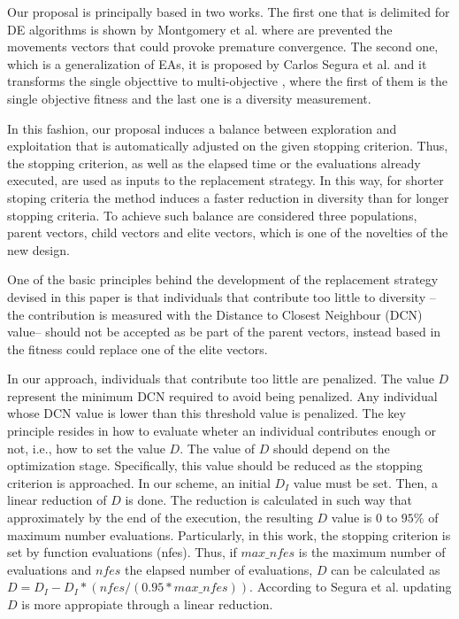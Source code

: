 Our proposal is principally based in two works.
%
The first one that is delimited for DE algorithms is shown by Montgomery et al. \cite{montgomery2012simple} where are prevented the movements vectors that could provoke premature convergence.
%
The second one, which is a generalization of EAs, it is proposed by Carlos Segura et al. and it transforms the single objecttive to multi-objective \cite{segura2016novel}, where the first of them is the single objective fitness and the last one is a diversity measurement.
%

In this fashion, our proposal induces a balance between exploration and exploitation that is automatically adjusted on the given stopping criterion.
%
Thus, the stopping criterion, as well as the elapsed time or the evaluations already executed, are used as inputs to the replacement strategy.
%
In this way, for shorter stoping criteria the method induces a faster reduction in diversity than for longer stopping criteria.
%
To achieve such balance are considered three populations, parent vectors, child vectors and elite vectors, which is one of the novelties of the new design.
%

One of the basic principles behind the development of the replacement strategy devised in this paper is that individuals that contribute too little to diversity --the contribution is measured with the Distance to Closest Neighbour (DCN) value-- should not be accepted as be part of the parent vectors, instead based in the fitness could replace one of the elite vectors.
%

In our approach, individuals that contribute too little are penalized.
%
The value $D$ represent the minimum DCN required to avoid being penalized.
%
Any individual whose DCN value is lower than this threshold value is penalized.
%
The key principle resides in how to evaluate wheter an individual contributes enough or not, i.e., how to set the value $D$.
%
The value of $D$ should depend on the optimization stage.
%
Specifically, this value should be reduced as the stopping criterion is approached.
%
In our scheme, an initial $D_I$ value must be set.
%
Then, a linear reduction of $D$ is done.
%
The reduction is calculated in such way that approximately by the end of the execution, the resulting $D$ value is $0$ to $95\%$ of maximum number evaluations.
%
Particularly, in this work, the stopping criterion is set by function evaluations (nfes).
%
Thus, if $max\_nfes$ is the maximum number of evaluations and $nfes$ the elapsed number of evaluations, $D$ can be calculated as $D=D_I - D_I *(nfes/(0.95*max\_nfes))$.
%
According to Segura et al. \cite{segura2016novel} updating $D$ is more appropiate through a linear reduction.
%


